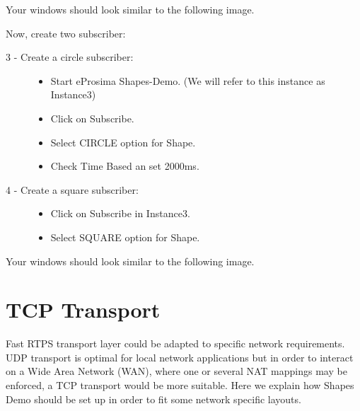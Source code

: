 \documentclass[letterpaper,10pt,english]{sphinxmanual}
\begin{document}
Your windows should look similar to the following image.


Now, create two subscriber:
\begin{description}
\item[{3 - Create a circle subscriber:}] \leavevmode\begin{itemize}
\item {} 
Start eProsima Shapes-Demo. (We will refer to this instance as Instance3)

\item {} 
Click on Subscribe.

\item {} 
Select CIRCLE option for Shape.

\item {} 
Check Time Based an set 2000ms.

\end{itemize}

\item[{4 - Create a square subscriber:}] \leavevmode\begin{itemize}
\item {} 
Click on Subscribe in Instance3.

\item {} 
Select SQUARE option for Shape.

\end{itemize}

\end{description}

Your windows should look similar to the following image.
\begin{quote}

\end{quote}


\chapter{TCP Transport}
\label{\detokenize{tcp_LAN_WAN_transport:tcp-transport}}\label{\detokenize{tcp_LAN_WAN_transport::doc}}
Fast RTPS transport layer could be adapted to specific network requirements. UDP transport is optimal for local network applications but in order to interact on a Wide Area Network (WAN), where one or several NAT mappings may be enforced, a TCP transport would be more suitable. Here we explain how Shapes Demo should be set up in order to fit some network specific layouts.
\end{document}
